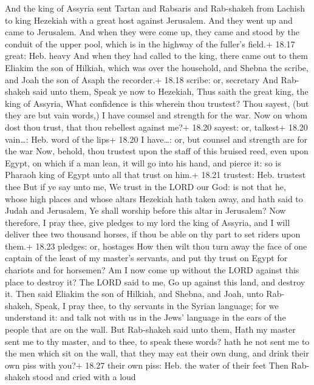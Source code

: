  And the king of Assyria sent Tartan and Rabsaris and
Rab-shakeh from Lachish to king Hezekiah with a great host against
Jerusalem. And they went up and came to Jerusalem. And when they were
come up, they came and stood by the conduit of the upper pool, which is
in the highway of the fuller's field.+ 18.17 great: Heb. heavy
 And when they had called to the king, there came out to
them Eliakim the son of Hilkiah, which was over the household, and
Shebna the scribe, and Joah the son of Asaph the recorder.+ 18.18
scribe: or, secretary  And Rab-shakeh said unto them, Speak
ye now to Hezekiah, Thus saith the great king, the king of Assyria, What
confidence is this wherein thou trustest?  Thou sayest,
(but they are but vain words,) I have counsel and strength for the war.
Now on whom dost thou trust, that thou rebellest against me?+ 18.20
sayest: or, talkest+ 18.20 vain\ldots: Heb. word of the lips+ 18.20 I
have\ldots: or, but counsel and strength are for the war 
Now, behold, thou trustest upon the staff of this bruised reed, even
upon Egypt, on which if a man lean, it will go into his hand, and pierce
it: so is Pharaoh king of Egypt unto all that trust on him.+ 18.21
trustest: Heb. trustest thee  But if ye say unto me, We
trust in the LORD our God: is not that he, whose high places and whose
altars Hezekiah hath taken away, and hath said to Judah and Jerusalem,
Ye shall worship before this altar in Jerusalem?  Now
therefore, I pray thee, give pledges to my lord the king of Assyria, and
I will deliver thee two thousand horses, if thou be able on thy part to
set riders upon them.+ 18.23 pledges: or, hostages  How
then wilt thou turn away the face of one captain of the least of my
master's servants, and put thy trust on Egypt for chariots and for
horsemen?  Am I now come up without the LORD against this
place to destroy it? The LORD said to me, Go up against this land, and
destroy it.  Then said Eliakim the son of Hilkiah, and
Shebna, and Joah, unto Rab-shakeh, Speak, I pray thee, to thy servants
in the Syrian language; for we understand it: and talk not with us in
the Jews' language in the ears of the people that are on the wall.
 But Rab-shakeh said unto them, Hath my master sent me to
thy master, and to thee, to speak these words? hath he not sent me to
the men which sit on the wall, that they may eat their own dung, and
drink their own piss with you?+ 18.27 their own piss: Heb. the water of
their feet  Then Rab-shakeh stood and cried with a loud
